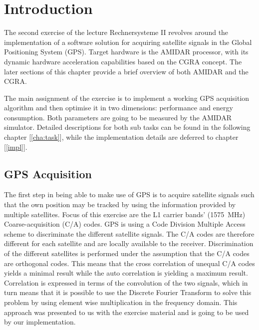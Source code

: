 \chapter{Introduction}
\label{cha:intro}
	The second exercise of the lecture Rechnersysteme II revolves around the implementation of a software solution for acquiring satellite signals in the Global Positioning System (GPS). Target hardware is the AMIDAR processor, with its dynamic hardware acceleration capabilities based on the CGRA concept. The later sections of this chapter provide a brief overview of both AMIDAR and the CGRA.

	The main assignment of the exercise is to implement a working GPS acquisition algorithm and then optimise it in two dimensions: performance and energy consumption. Both parameters are going to be measured by the AMIDAR simulator. Detailed descriptions for both sub tasks can be found in the following chapter [\ref{cha:task}], while the implementation details are deferred to chapter [\ref{impl}].

	\section{GPS Acquisition} %
	\label{sec:intro_acq}
		The first step in being able to make use of GPS is to acquire satellite signals such that the own position may be tracked by using the information provided by multiple satellites.
		Focus of this exercise are the L1 carrier bands' (\SI{1575}{\mega\hertz}) Coarse-acquisition (C/A) codes. GPS is using a Code Division Multiple Access scheme to discriminate the different satellite signals. The C/A codes are therefore different for each satellite and are locally available to the receiver. 
		Discrimination of the different satellites is performed under the assumption that the C/A codes are orthogonal codes. This means that the cross correlation of unequal C/A codes yields a minimal result while the auto correlation is yielding a maximum result. Correlation is expressed in terms of the convolution of the two signals, which in turn means that it is possible to use the Discrete Fourier Transform to solve this problem by using element wise multiplication in the frequency domain. This approach was presented to us with the exercise material and is going to be used by our implementation.

